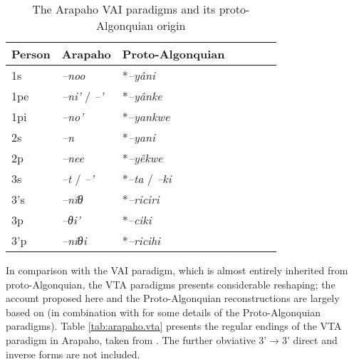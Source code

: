\documentclass[twoside,a4paper,11pt]{article}
\newcommand{\ipa}[1]{{\phon\textit{#1}}}
\newcommand{\grise}[1]{\cellcolor{lightgray}\textbf{#1}}
\newcommand{\Σ}{\greek{Σ}}
\begin{document}
\begin{table}[H]
\caption{The Arapaho VAI paradigms and its proto-Algonquian origin}
\centering \label{tab:arapaho.vai}
\begin{tabular}{lllllll}
\toprule
Person &   Arapaho    & Proto-Algonquian\\
\midrule
1s & 	\ipa{--noo} &  	*\ipa{--yâni} & 	\\	
1pe & 	\ipa{--ni'} /  	\ipa{--'} \grise{} & 		 *\ipa{--yânke}	 \\	
1pi & 	\ipa{--no'} & 	 		*\ipa{--yankwe} & 	\\	
\midrule
2s & 	\ipa{--n} & 	 	*\ipa{--yani} & 	\\	
2p & 	\ipa{--nee} & 	  		*\ipa{--yêkwe} & 	\\	
\midrule
3s & 	\ipa{--t} /	\ipa{--'} & 		*\ipa{--ta} / \ipa{--ki}& 	\\	
3's & 	\ipa{--níθ} &  		*\ipa{--riciri} & 	\\	
3p & 	\ipa{--θi'} &  		*\ipa{--ciki} 	\\	
3'p & 	\ipa{--níθi} & 	 		*\ipa{--ricihi} 	\\	
\bottomrule
\end{tabular}
\end{table}

In comparison with the VAI paradigm, which is almost entirely inherited from proto-Algonquian, the VTA paradigms presents considerable reshaping; the account proposed here and the Proto-Algonquian reconstructions are largely based on  \citet[19-24]{goddard65arapaho} (in combination with  \citealt{goddard00cheyenne} for some details of the Proto-Algonquian paradigms). Table \ref{tab:arapaho.vta}   presents the regular endings of the VTA paradigm in Arapaho, taken from  \citet[487-490]{cowell06arapaho}. The  further obviative 3'$\rightarrow$3' direct and inverse forms are not included.
\end{document}
